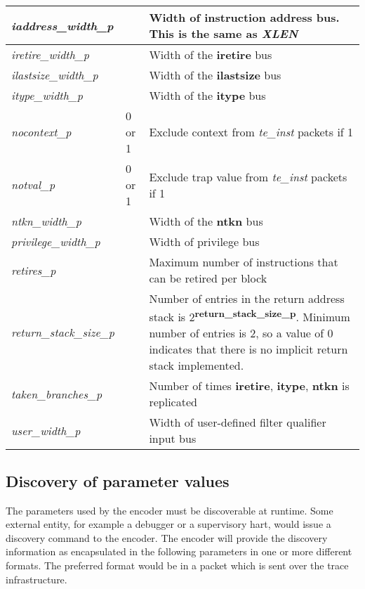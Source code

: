\begin{table}[h]
\begin{tabulary}{\textwidth}{|l|p{25mm}|p{80mm}|}
        \hline
        \textit{iaddress\_width\_p} & & Width of instruction address bus. This is the same as \textit{XLEN}\\
        \hline
        \textit{iretire\_width\_p} & & Width of the \textbf{iretire} bus\\
        \hline
        \textit{ilastsize\_width\_p} & & Width of the \textbf{ilastsize} bus\\
        \hline
        \textit{itype\_width\_p} & & Width of the \textbf{itype} bus\\
        \hline
        \textit{nocontext\_p} & 0 or 1 & Exclude context from \textit{te\_inst} packets if 1 \\
        \hline
        \textit{notval\_p} & 0 or 1 & Exclude trap value from \textit{te\_inst} packets if 1 \\
        \hline
        \textit{ntkn\_width\_p} & & Width of the \textbf{ntkn} bus\\
        \hline
        \textit{privilege\_width\_p} & & Width of privilege bus \\
        \hline
        \textit{retires\_p} &  & Maximum number of instructions that can be retired per block \\
        \hline
        \textit{return\_stack\_size\_p} &  & Number of entries in the return address stack is 2\textsuperscript{\textbf{return\_stack\_size\_p}}.
                                    Minimum number of entries is 2, so a value of 0 indicates that there is no implicit return stack implemented.\\
        \hline
        \textit{taken\_branches\_p} & & Number of times \textbf{iretire}, \textbf{itype}, \textbf{ntkn} is replicated\\
        \hline
        \textit{user\_width\_p} & & Width of user-defined filter qualifier input bus \\
        \hline
    \end{tabulary}
\end{table}
\FloatBarrier

\subsection {Discovery of parameter values}

The parameters used by the encoder must be discoverable at
runtime. Some external entity, for example a debugger or a supervisory
hart, would issue a discovery command to the encoder. The encoder will
provide the discovery information as encapsulated in the following
parameters in one or more different formats.  The preferred format
would be in a packet which is sent over the trace infrastructure.

